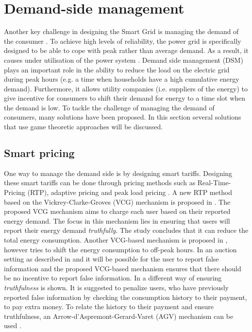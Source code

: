 \section{Demand-side management}
Another key challenge in designing the Smart Grid is managing the demand of the consumer \cite{keypaper}. To achieve high levels of reliability, the power grid is specifically designed to be able to cope with peak rather than average demand. As a result, it causes under utilisation of the power system \cite{MaDengSongEtAl2014}. Demand side management (DSM) plays an important role in the ability to reduce the load on the electric grid during peak hours (e.g. a time when households have a high cumulative energy demand). Furthermore, it allows utility companies (i.e. suppliers of the energy) to give incentive for consumers to shift their demand for energy to a time slot when the demand is low. To tackle the challenge of managing the demand of consumers, many solutions have been proposed. In this section several solutions that use game theoretic approaches will be discussed. 

\subsection{Smart pricing}
One way to manage the demand side is by designing smart tariffs. Designing these smart tariffs can be done through pricing methods such as Real-Time-Pricing (RTP), adaptive pricing and peak load pricing \cite{SamadiMohsenian-RadSchoberEtAl2012}. A new RTP method based on the Vickrey-Clarke-Groves (VCG) mechanism is proposed in \cite{SamadiMohsenian-RadSchoberEtAl2012}. The proposed VCG mechanism aims to charge each user based on their reported energy demand. The focus in this mechanism lies in ensuring that users will report their energy demand \textit{truthfully}. The study concludes that it can reduce the total energy consumption. Another VCG-based mechanism is proposed in \cite{SamadiSchoberWong2011}, however tries to shift the energy consumption to off-peak hours. In an auction setting as described in \cite{SamadiMohsenian-RadSchoberEtAl2012} and \cite{SamadiSchoberWong2011} it will be possible for the user to report false information and the proposed VCG-based mechanism ensures that there should be no incentive to report false information. In \cite{MaDengSongEtAl2014} a different way of ensuring \textit{truthfulness} is shown. It is suggested to penalize users, who have previously reported false information by checking the consumption history to their payment, to pay extra money. To relate the history to their payment and ensure truthfulness, an Arrow-d'Aspremont-Gerard-Varet (AGV) mechanism can be used \cite{MaDengSongEtAl2014}.


